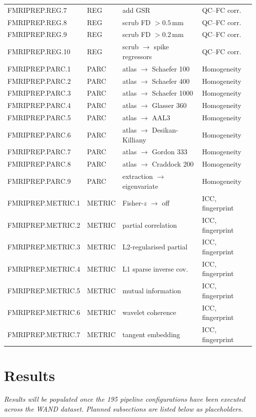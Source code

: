 \documentclass[11pt,a4paper]{article}
\begin{document}
\begin{longtable}{@{}llll@{}}
FMRIPREP.REG.7  & REG & add GSR                     & QC--FC corr. \\
FMRIPREP.REG.8  & REG & scrub FD $> 0.5$\,mm        & QC--FC corr. \\
FMRIPREP.REG.9  & REG & scrub FD $> 0.2$\,mm        & QC--FC corr. \\
FMRIPREP.REG.10 & REG & scrub $\to$ spike regressors & QC--FC corr. \\
\midrule
FMRIPREP.PARC.1  & PARC & atlas $\to$ Schaefer 100  & Homogeneity \\
FMRIPREP.PARC.2  & PARC & atlas $\to$ Schaefer 400  & Homogeneity \\
FMRIPREP.PARC.3  & PARC & atlas $\to$ Schaefer 1000 & Homogeneity \\
FMRIPREP.PARC.4  & PARC & atlas $\to$ Glasser 360   & Homogeneity \\
FMRIPREP.PARC.5  & PARC & atlas $\to$ AAL3          & Homogeneity \\
FMRIPREP.PARC.6  & PARC & atlas $\to$ Desikan-Killiany & Homogeneity \\
FMRIPREP.PARC.7  & PARC & atlas $\to$ Gordon 333    & Homogeneity \\
FMRIPREP.PARC.8  & PARC & atlas $\to$ Craddock 200  & Homogeneity \\
FMRIPREP.PARC.9  & PARC & extraction $\to$ eigenvariate & Homogeneity \\
\midrule
FMRIPREP.METRIC.1 & METRIC & Fisher-$z$ $\to$ off   & ICC, fingerprint \\
FMRIPREP.METRIC.2 & METRIC & partial correlation     & ICC, fingerprint \\
FMRIPREP.METRIC.3 & METRIC & L2-regularised partial  & ICC, fingerprint \\
FMRIPREP.METRIC.4 & METRIC & L1 sparse inverse cov.  & ICC, fingerprint \\
FMRIPREP.METRIC.5 & METRIC & mutual information      & ICC, fingerprint \\
FMRIPREP.METRIC.6 & METRIC & wavelet coherence       & ICC, fingerprint \\
FMRIPREP.METRIC.7 & METRIC & tangent embedding       & ICC, fingerprint \\
\end{longtable}

\section{Results}

\textit{Results will be populated once the 195 pipeline configurations have been executed across the WAND dataset.  Planned subsections are listed below as placeholders.}
\end{document}
